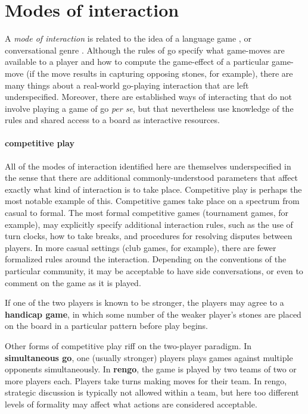 \documentclass{scrartcl}
\begin{document}
\section{Modes of interaction}

A \emph{mode of interaction} is related to the idea of a
language game \citep{wittgensteinPhilosophischeUntersuchungenPhilosophical2009}, or
conversational genre \citep{bakhtinSpeechGenresOther1987}.
Although the rules of go specify what game-moves are available to a player
and how to compute the game-effect of a particular game-move
(if the move results in capturing opposing stones, for example),
there are many things about a real-world go-playing interaction that are left
underspecified.
Moreover, there are established ways of interacting
that do not involve playing a game of go \textit{per se},
but that nevertheless 
use knowledge of the rules and shared access to a board
as interactive resources.

\paragraph{competitive play} All of the modes of interaction 
identified here are themselves underspecified in the sense that there 
are additional commonly-understood parameters that affect exactly what kind
of interaction is to take place.
Competitive play is perhaps the most notable example of this.
Competitive games take place on a spectrum from casual to formal.
The most formal competitive games (tournament games, for example),
may explicitly specify additional interaction rules,
such as the use of turn clocks, 
how to take breaks, and
procedures for resolving disputes between players.
In more casual settings (club games, for example),
there are fewer formalized rules around the interaction.
Depending on the conventions of the particular community,
it may be acceptable to have side conversations, 
or even to comment on the game as it is played.

If one of the two players is known to be stronger,
the players may agree to a \textbf{handicap game},
in which some number of the weaker player's stones are placed on the board 
in a particular pattern before play begins.

Other forms of competitive play riff on the two-player paradigm.
In \textbf{simultaneous go}, one (usually stronger) players plays
games against multiple opponents simultaneously.
In \textbf{rengo}, the game is played by two teams of two or more players each.
Players take turns making moves for their team.
In rengo, strategic discussion is typically not allowed within a team, 
but here too different levels of formality may affect what actions are 
considered acceptable.
\end{document}
